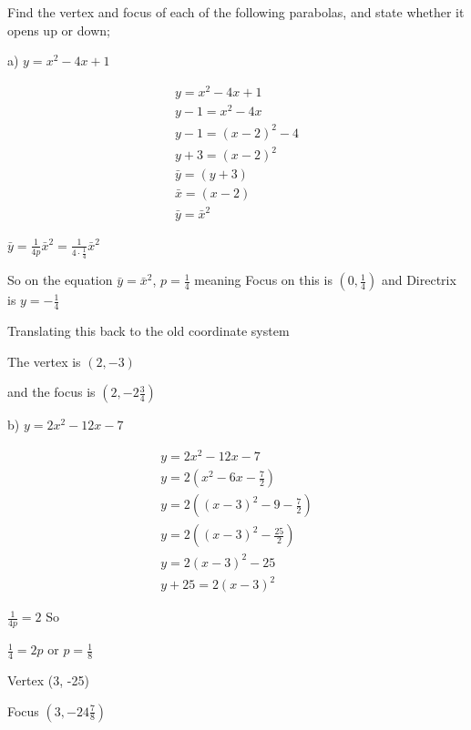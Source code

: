 \documentclass[]{report}
\begin{document}
Find the vertex and focus of each of the following parabolas, and state whether it opens up or down;

a) $y = x^2 - 4x + 1$

\begin{align*}
y = x^2 -4x + 1 \tag{1} \\
y - 1 = x^2 -4x \tag{taking 1 off both sides} \\
y -1 = (x-2)^2 - 4 \tag{completing the square} \\
y + 3 = (x-2)^2 \\
\bar{y} = (y+3)  \tag{Assigning the left hand side to a new y coordinate system}\\
\bar{x} = (x-2) \tag{Similarly for the right hand side to a new x coordinate system}\\
\bar{y} = \bar{x}^2
\end{align*}

$\bar{y} = \frac{1}{4p}\bar{x}^2 = \frac{1}{4 \cdot \frac{1}{4}}\bar{x}^2$

So on the equation $\bar{y} = \bar{x}^2$, $p = \frac{1}{4}$ meaning Focus on this is $(0, \frac{1}{4})$ and Directrix is $y = -\frac{1}{4}$

Translating this back to the old coordinate system

The vertex is $(2,-3)$

and the focus is $(2, -2\frac{3}{4})$


b) $y = 2x^2 - 12x - 7 $

\begin{align*}
y = 2x^2 - 12x - 7  \tag{1} \\
y = 2(x^2 - 6x - \frac{7}{2}) \\
y = 2((x - 3)^2 -9 - \frac{7}{2}) \\
y = 2((x- 3)^2 - \frac{25}{2}) \\
y = 2(x-3)^2 - 25\\
y + 25 = 2(x-3)^2
\end{align*}

$\frac{1}{4p} = 2$
So

$\frac{1}{4} = 2p$ or $p = \frac{1}{8}$

Vertex (3, -25)

Focus $(3, -24\frac{7}{8})$
\end{document}

